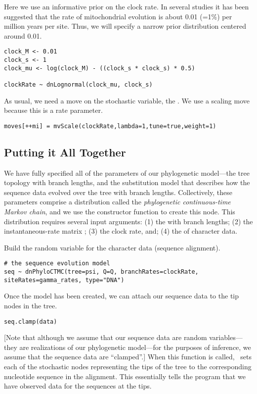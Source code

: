 Here we use an informative prior on the clock rate.
In several studies it has been suggested that the rate of mitochondrial evolution is about 0.01 (=1\%) per million years per site.
Thus, we will specify a narrow prior distribution centered around 0.01.
{\tt \begin{snugshade*}
\begin{lstlisting}
clock_M <- 0.01
clock_s <- 1
clock_mu <- log(clock_M) - ((clock_s * clock_s) * 0.5)

clockRate ~ dnLognormal(clock_mu, clock_s)
\end{lstlisting}
\end{snugshade*}}
As usual, we need a move on the stochastic variable, the .
We use a scaling move because this is a rate parameter. 
{\tt \begin{snugshade*}
\begin{lstlisting}
moves[++mi] = mvScale(clockRate,lambda=1,tune=true,weight=1)
\end{lstlisting}
\end{snugshade*}}

\subsection{Putting it All Together}

We have fully specified all of the parameters of our phylogenetic model---the tree topology with branch lengths, and the substitution model that describes how the sequence data evolved over the tree with branch lengths.  
Collectively, these parameters comprise a distribution called the \textit{phylogenetic continuous-time Markov chain}, and we use the  constructor function to create this node.
This distribution requires several input arguments: 
(1) the  with branch lengths; 
(2) the instantaneous-rate matrix ;
(3) the clock rate, and; 
(4) the  of character data.


Build the random variable for the character data (sequence alignment).
{\tt \begin{snugshade*}
\begin{lstlisting}
# the sequence evolution model
seq ~ dnPhyloCTMC(tree=psi, Q=Q, branchRates=clockRate, siteRates=gamma_rates, type="DNA")
\end{lstlisting}
\end{snugshade*}}


Once the  model has been created, we can attach our sequence data to the tip nodes in the tree.
{\tt \begin{snugshade*}
\begin{lstlisting}
seq.clamp(data)
\end{lstlisting}
\end{snugshade*}}
[Note that although we assume that our sequence data are random variables---they are realizations of our phylogenetic model---for the purposes of inference, we assume that the sequence data are ``clamped''.]
When this function is called, \RevBayes~sets each of the stochastic nodes representing the tips of the tree to the corresponding nucleotide sequence in the alignment. 
This essentially tells the program that we have observed data for the sequences at the tips. 


